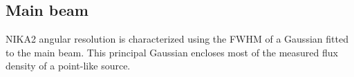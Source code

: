 %



\subsection{Main beam}
\label{se:mainbeam}

NIKA2 angular resolution {\lp is characterized using the FWHM of a
Gaussian fitted to the main beam. This principal Gaussian encloses
most of the measured flux density of a point-like source.} %


